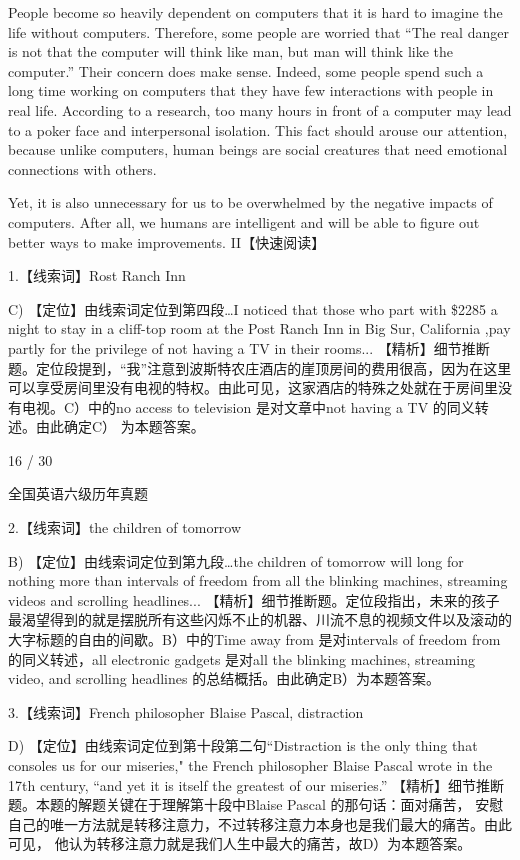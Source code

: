\documentclass[UTF8,11pt]{ctexart}
\begin{document}
People become so heavily dependent on computers that it is hard to imagine the life without computers. Therefore, some people are worried that “The real danger is not that the computer will think like man, but man will think like the computer.” Their concern does make sense. Indeed, some people spend such a long time working on computers that they have few interactions with people in real life. According to a research, too many hours in front of a computer may lead to a poker face and interpersonal isolation. This fact should arouse our attention, because unlike computers, human beings are social creatures that need emotional connections with others.


Yet, it is also unnecessary for us to be overwhelmed by the negative impacts of computers. After all, we humans are intelligent and will be able to figure out better ways to make improvements. II【快速阅读】


1.【线索词】Rost Ranch Inn


C) 【定位】由线索词定位到第四段…I noticed that those who part with \$2285 a night to stay in a cliff-top room at the Post Ranch Inn in Big Sur, California ,pay partly for the privilege of not having a TV in their rooms... 【精析】细节推断题。定位段提到，“我”注意到波斯特农庄酒店的崖顶房间的费用很高，因为在这里可以享受房间里没有电视的特权。由此可见，这家酒店的特殊之处就在于房间里没有电视。C）中的no access to television 是对文章中not having a TV 的同义转述。由此确定C） 为本题答案。


16 / 30


全国英语六级历年真题


2.【线索词】the children of tomorrow


B) 【定位】由线索词定位到第九段…the children of tomorrow will long for nothing more than intervals of freedom from all the blinking machines, streaming videos and scrolling headlines... 【精析】细节推断题。定位段指出，未来的孩子最渴望得到的就是摆脱所有这些闪烁不止的机器、川流不息的视频文件以及滚动的大字标题的自由的间歇。B）中的Time away from 是对intervals of freedom from 的同义转述，all electronic gadgets 是对all the blinking machines, streaming video, and scrolling headlines 的总结概括。由此确定B）为本题答案。


3.【线索词】French philosopher Blaise Pascal, distraction


D) 【定位】由线索词定位到第十段第二句“Distraction is the only thing that consoles us for our miseries," the French philosopher Blaise Pascal wrote in the 17th century, “and yet it is itself the greatest of our miseries.” 【精析】细节推断题。本题的解题关键在于理解第十段中Blaise Pascal 的那句话：面对痛苦， 安慰自己的唯一方法就是转移注意力，不过转移注意力本身也是我们最大的痛苦。由此可见， 他认为转移注意力就是我们人生中最大的痛苦，故D）为本题答案。
\end{document}
